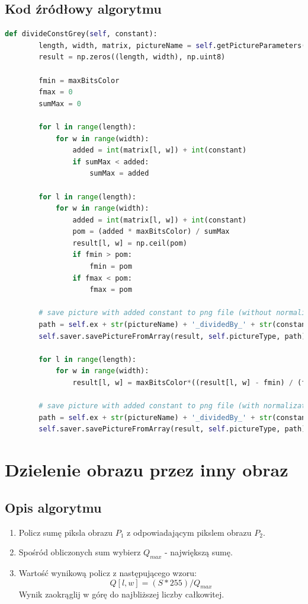 \documentclass[a4paper,12pt, titlepage]{report}
\begin{document}
\subsection*{Kod źródłowy algorytmu}
\begin{lstlisting}[language=Python]
def divideConstGrey(self, constant):
        length, width, matrix, pictureName = self.getPictureParameters(self.pic1)
        result = np.zeros((length, width), np.uint8)

        fmin = maxBitsColor
        fmax = 0
        sumMax = 0

        for l in range(length):
            for w in range(width):
                added = int(matrix[l, w]) + int(constant)
                if sumMax < added:
                    sumMax = added

        for l in range(length):
            for w in range(width):
                added = int(matrix[l, w]) + int(constant)
                pom = (added * maxBitsColor) / sumMax
                result[l, w] = np.ceil(pom)
                if fmin > pom:
                    fmin = pom
                if fmax < pom:
                    fmax = pom

        # save picture with added constant to png file (without normalization)
        path = self.ex + str(pictureName) + '_dividedBy_' + str(constant) + '.png'
        self.saver.savePictureFromArray(result, self.pictureType, path)

        for l in range(length):
            for w in range(width):
                result[l, w] = maxBitsColor*((result[l, w] - fmin) / (fmax - fmin))

        # save picture with added constant to png file (with normalization)
        path = self.ex + str(pictureName) + '_dividedBy_' + str(constant) + '_normalized.png'
        self.saver.savePictureFromArray(result, self.pictureType, path)
\end{lstlisting}

\section{Dzielenie obrazu przez inny obraz}
\subsection*{Opis algorytmu}
\begin{enumerate}
\item Policz sumę piksla obrazu \(P_{1}\) z odpowiadającym pikslem obrazu \(P_{2}\).
\item Spośród obliczonych sum wybierz \(Q_{max}\) - największą sumę.
\item Wartość wynikową policz z następującego wzoru: \[Q[l,w]=(S*255)/Q_{max}\]Wynik zaokrąglij w górę do najbliższej liczby całkowitej.
\end{enumerate}
\end{document}
